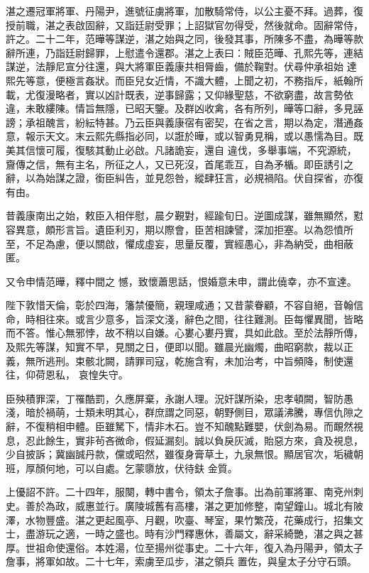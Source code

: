 \begin{pinyinscope}
 湛之遷冠軍將軍、丹陽尹，進號征虜將軍，加散騎常侍，以公主憂不拜。過葬，復授前職，湛之表啟固辭，又詣廷尉受罪；上詔獄官勿得受，然後就命。固辭常侍，許之。二十二年，范曄等謀逆，湛之始與之同，後發其事，所陳多不盡，為曄等款辭所連，乃詣廷尉歸罪，上慰遣令還郡。湛之上表曰：賊臣范曄、孔熙先等，連結謀逆，法靜尼宣分往還，與大將軍臣義康共相脣齒，備於鞠對。伏尋仲承祖始
 達熙先等意，便極言姦狀。而臣兒女近情，不識大體，上聞之初，不務指斥，紙翰所載，尤復漫略者，實以凶計既表，逆事歸露；又仰緣聖慈，不欲窮盡，故言勢依違，未敢縷陳。情旨無隱，已昭天鑒。及群凶收禽，各有所列，曄等口辭，多見誣謗；承祖醜言，紛紜特甚。乃云臣與義康宿有密契，在省之言，期以為定，潛通姦意，報示天文。末云熙先縣指必同，以誑於曄，或以智勇見稱，或以愚懦為目。既美其信懷可履，復駭其動止必啟。凡諸詭妄，還自
 違伐，多舉事端，不究源統，齎傳之信，無有主名，所征之人，又已死沒，首尾乖互，自為矛楯。即臣誘引之辭，以為始謀之證，銜臣糾告，並見怨咎，縱肆狂言，必規禍陷。伏自探省，亦復有由。



 昔義康南出之始，敕臣入相伴慰，晨夕覲對，經踰旬日。逆圖成謀，雖無顯然，懟容異意，頗形言旨。遺臣利刃，期以際會，臣苦相諫譬，深加拒塞。以為怨憤所至，不足為慮，便以關啟，懼成虛妄，思量反覆，實經愚心，非為納受，曲相蔽匿。



 又令申情范曄，釋中間之
 憾，致懷蕭思話，恨婚意未申，謂此僥幸，亦不宣達。



 陛下敦惜天倫，彰於四海，籓禁優簡，親理咸通；又昔蒙眷顧，不容自絕，音翰信命，時相往來。或言少意多，旨深文淺，辭色之間，往往難測。臣每懼異聞，皆略而不答。惟心無邪悖，故不稍以自嫌。心婁心婁丹實，具如此啟。至於法靜所傳，及熙先等謀，知實不早，見關之日，便即以聞。雖晨光幽燭，曲昭窮款，裁以正義，無所逃刑。束骸北闕，請罪司寇，乾施含宥，未加治考，中旨頻降，制使還往，仰荷恩私，
 哀惶失守。



 臣殃積罪深，丁罹酷罰，久應屏棄，永謝人理。況奸謀所染，忠孝頓闕，智防愚淺，暗於禍萌，士類未明其心，群庶謂之同惡，朝野側目，眾議沸騰，專信仇隙之辭，不復稍相申體。臣雖駑下，情非木石。豈不知醜點難嬰，伏劍為易。而靦然視息，忍此餘生，實非茍吝微命，假延漏刻。誠以負戾灰滅，貽惡方來，貪及視息，少自披訴；冀幽誠丹款，儻或昭然，雖復身膏草土，九泉無恨。顯居官次，垢穢朝班，厚顏何地，可以自處。乞蒙隳放，伏待鈇
 金質。



 上優詔不許。二十四年，服闋，轉中書令，領太子詹事。出為前軍將軍、南兗州刺史。善於為政，威惠並行。廣陵城舊有高樓，湛之更加修整，南望鐘山。城北有陂澤，水物豐盛。湛之更起風亭、月觀，吹臺、琴室，果竹繁茂，花藥成行，招集文士，盡游玩之適，一時之盛也。時有沙門釋惠休，善屬文，辭采綺艷，湛之與之甚厚。世祖命使還俗。本姓湯，位至揚州從事史。二十六年，復入為丹陽尹，領太子詹事，將軍如故。二十七年，索虜至瓜步，湛之領兵
 置佐，與皇太子分守石頭。




\end{pinyinscope}
